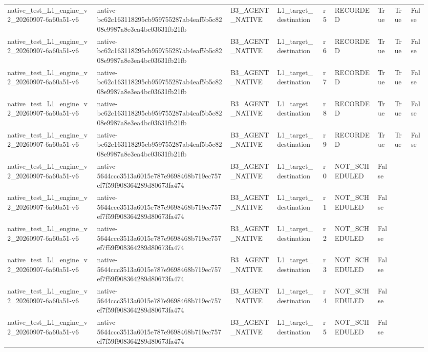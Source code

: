 \begin{tabular}{lllllllll}
native\_test\_L1\_engine\_v2\_20260907-6a60a51-v6 & native-bc62c163118295cb959755287ab4eaf5b5c8208e9987a8e3ea4bc03631fb21fb & B3\_AGENT\_NATIVE & L1\_target\_destination & r5 & RECORDED & True & True & False \\
native\_test\_L1\_engine\_v2\_20260907-6a60a51-v6 & native-bc62c163118295cb959755287ab4eaf5b5c8208e9987a8e3ea4bc03631fb21fb & B3\_AGENT\_NATIVE & L1\_target\_destination & r6 & RECORDED & True & True & False \\
native\_test\_L1\_engine\_v2\_20260907-6a60a51-v6 & native-bc62c163118295cb959755287ab4eaf5b5c8208e9987a8e3ea4bc03631fb21fb & B3\_AGENT\_NATIVE & L1\_target\_destination & r7 & RECORDED & True & True & False \\
native\_test\_L1\_engine\_v2\_20260907-6a60a51-v6 & native-bc62c163118295cb959755287ab4eaf5b5c8208e9987a8e3ea4bc03631fb21fb & B3\_AGENT\_NATIVE & L1\_target\_destination & r8 & RECORDED & True & True & False \\
native\_test\_L1\_engine\_v2\_20260907-6a60a51-v6 & native-bc62c163118295cb959755287ab4eaf5b5c8208e9987a8e3ea4bc03631fb21fb & B3\_AGENT\_NATIVE & L1\_target\_destination & r9 & RECORDED & True & True & False \\
native\_test\_L1\_engine\_v2\_20260907-6a60a51-v6 & native-5644ccc3513a6015e787e9698468b719ec757ef7f59f908364289d80673fa474 & B3\_AGENT\_NATIVE & L1\_target\_destination & r0 & NOT\_SCHEDULED & False &  &  \\
native\_test\_L1\_engine\_v2\_20260907-6a60a51-v6 & native-5644ccc3513a6015e787e9698468b719ec757ef7f59f908364289d80673fa474 & B3\_AGENT\_NATIVE & L1\_target\_destination & r1 & NOT\_SCHEDULED & False &  &  \\
native\_test\_L1\_engine\_v2\_20260907-6a60a51-v6 & native-5644ccc3513a6015e787e9698468b719ec757ef7f59f908364289d80673fa474 & B3\_AGENT\_NATIVE & L1\_target\_destination & r2 & NOT\_SCHEDULED & False &  &  \\
native\_test\_L1\_engine\_v2\_20260907-6a60a51-v6 & native-5644ccc3513a6015e787e9698468b719ec757ef7f59f908364289d80673fa474 & B3\_AGENT\_NATIVE & L1\_target\_destination & r3 & NOT\_SCHEDULED & False &  &  \\
native\_test\_L1\_engine\_v2\_20260907-6a60a51-v6 & native-5644ccc3513a6015e787e9698468b719ec757ef7f59f908364289d80673fa474 & B3\_AGENT\_NATIVE & L1\_target\_destination & r4 & NOT\_SCHEDULED & False &  &  \\
native\_test\_L1\_engine\_v2\_20260907-6a60a51-v6 & native-5644ccc3513a6015e787e9698468b719ec757ef7f59f908364289d80673fa474 & B3\_AGENT\_NATIVE & L1\_target\_destination & r5 & NOT\_SCHEDULED & False &  &  \\

\end{tabular}
